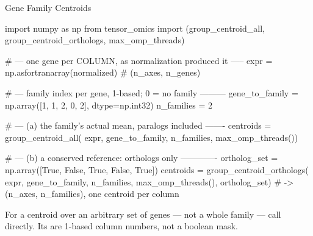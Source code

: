 \begin{recipe}[label=sub:family-centroids]{Gene Family Centroids}

\begin{codefragment}[language=Python,caption={Fragments to edit: the mapping, and which members define the centroid}]
import numpy as np
from tensor_omics import (group_centroid_all,
                          group_centroid_orthologs,
                          max_omp_threads)

# --- one gene per COLUMN, as normalization produced it -----
expr = np.asfortranarray(normalized)   # (n_axes, n_genes)

# --- family index per gene, 1-based; 0 = no family ---------
gene_to_family = np.array([1, 1, 2, 0, 2], dtype=np.int32)
n_families = 2

# --- (a) the family's actual mean, paralogs included -------
centroids = group_centroid_all(
    expr, gene_to_family, n_families, max_omp_threads())

# --- (b) a conserved reference: orthologs only -------------
ortholog_set = np.array([True, False, True, False, True])
centroids = group_centroid_orthologs(
    expr, gene_to_family, n_families, max_omp_threads(),
    ortholog_set)
#   -> (n_axes, n_families), one centroid per column
\end{codefragment}

\begin{note}
  For a centroid over an arbitrary set of genes --- not a whole family ---
  call  directly. Its
   are 1-based column numbers, not a boolean mask.
\end{note}


\end{recipe}
